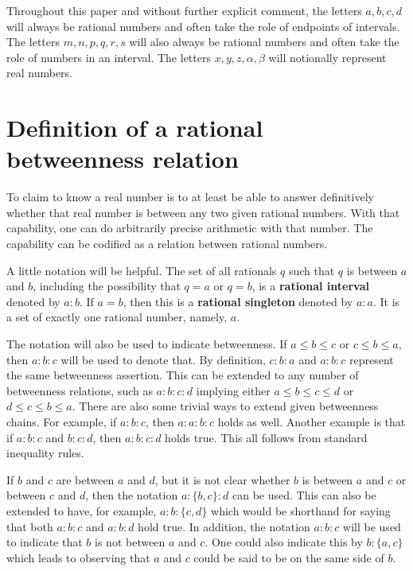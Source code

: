 \documentclass[12pt]{article}
\begin{document}
Throughout this paper and without further explicit comment, the letters $a, b, c, d$ will always be rational numbers and often take the role of endpoints of intervals. The letters $m, n, p, q, r, s$ will also always be rational numbers and often take the role of numbers in an interval. The letters $x, y, z, \alpha, \beta$ will notionally represent real numbers.

\section{Definition of a rational betweenness relation}

To claim to know a real number is to at least be able to answer definitively whether that real number is between any two given rational numbers. With that capability, one can do arbitrarily precise arithmetic with that number. The capability can be codified as a relation between rational numbers. 

A little notation will be helpful. The set of all rationals $q$ such that $q$ is between $a$ and $b$, including the possibility that $q=a$ or $q=b$, is a \textbf{rational interval} denoted by $a:b$. If $a=b$, then this is a \textbf{rational singleton} denoted by $a:a$. It is a set of exactly one rational number, namely, $a$. 

The notation will also be used to indicate betweenness. If $a \leq b \leq c$ or $c \leq b \leq a$, then $a:b:c$ will be used to denote that. By definition, $c:b:a$ and $a:b:c$ represent the same betweenness assertion. This can be extended to any number of betweenness relations, such as $a:b:c:d$ implying either $a \leq b \leq c \leq d$ or $d \leq c \leq b \leq a$. There are also some trivial ways to extend given betweenness chains. For example, if $a:b:c$, then $a:a:b:c$ holds as well. Another example is that if $a:b:c$ and $b:c:d$, then $a:b:c:d$ holds true. This all follows from standard inequality rules. 

If $b$ and $c$ are between $a$ and $d$, but it is not clear whether $b$ is between $a$ and $c$ or between $c$ and $d$, then the notation $a:\{b,c\}:d$ can be used. This can also be extended to have, for example, $a:b:\{c,d\}$ which would be shorthand for saying that both $a:b:c$ and $a:b:d$ hold true. In addition, the notation \sout{$a:b:c$} will be used to indicate that $b$ is not between $a$ and $c$. One could also indicate this by $b:\{a,c\}$ which leads to observing that $a$ and $c$ could be said to be on the same side of $b$. 
\end{document}
